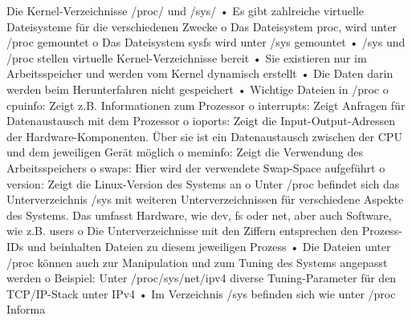Die Kernel-Verzeichnisse /proc/ und /sys/
• Es gibt zahlreiche virtuelle Dateisysteme für die verschiedenen Zwecke
o Das Dateisystem proc, wird unter /proc gemountet
o Das Dateisystem sysfs wird unter /sys gemountet
• /sys und /proc stellen virtuelle Kernel-Verzeichnisse bereit
• Sie existieren nur im Arbeitsspeicher und werden vom Kernel dynamisch erstellt
• Die Daten darin werden beim Herunterfahren nicht gespeichert
• Wichtige Dateien in /proc
o cpuinfo: Zeigt z.B. Informationen zum Prozessor
o interrupts: Zeigt Anfragen für Datenaustausch mit dem Prozessor
o ioports: Zeigt die Input-Output-Adressen der Hardware-Komponenten. Über sie ist
ein Datenaustausch zwischen der CPU und dem jeweiligen Gerät möglich
o meminfo: Zeigt die Verwendung des Arbeitsspeichers
o swaps: Hier wird der verwendete Swap-Space aufgeführt
o version: Zeigt die Linux-Version des Systems an
o Unter /proc befindet sich das Unterverzeichnis /sys mit weiteren
Unterverzeichnissen für verschiedene Aspekte des Systems. Das umfasst Hardware,
wie dev, fs oder net, aber auch Software, wie z.B. users
o Die Unterverzeichnisse mit den Ziffern entsprechen den Prozess-IDs und beinhalten
Dateien zu diesem jeweiligen Prozess
• Die Dateien unter /proc können auch zur Manipulation und zum Tuning des Systems
angepasst werden
o Beispiel: Unter /proc/sys/net/ipv4 diverse Tuning-Parameter für den TCP/IP-Stack
unter IPv4
• Im Verzeichnis /sys befinden sich wie unter /proc Informa